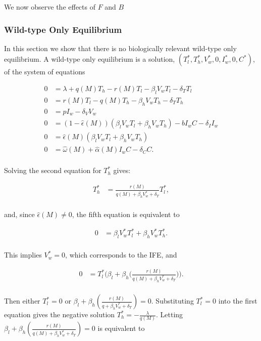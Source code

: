 \documentclass[11pt, oneside]{article}    %
\begin{document}
We now observe the effects of $F$ and $B$ 

\vspace{5mm}

\subsubsection{Wild-type Only Equilibrium}

In this section we show that there is no biologically relevant wild-type only equilibrium. A wild-type only equilibrium is a solution, $(T_l^*, T_h^*, V_w^*, 0, I_w^*, 0, C^*)$, of the system of equations 

\begin{align*}
 0 & =   \lambda + q(M) T_h - r(M) T_l  - {\beta_l} V_w T_l - \delta_T T_l \\
0 & = r(M) T_l - q(M) T_h  -  \beta_h V_w T_h - \delta_T T_h\\
0 & =  p I_w - \delta_V V_w\\
0 & =  (1-\hat{\epsilon}(M))(\beta_l V_w T_l + \beta_h V_w T_h) - b I_w C - \delta_I I_w\\
0 & =  \hat{\epsilon}(M)(\beta_l V_w T_l + \beta_h V_w T_h) \\
0 & =  \hat{\omega}(M) + \hat{\alpha}(M) I_w C - \delta_C C.\\
\end{align*}

Solving the second equation for $T_h^*$ gives:

\begin{align*}
 T_h^* & =  \frac{r(M)}{q(M)+\beta_h V_w^*  + \delta_T} T_l^*,\\
\end{align*}

and, since $\hat{\epsilon}(M) \neq 0$, the fifth equation is equivalent to

\begin{align*}
 0 & =  \beta_l V_w^* T_l^* + \beta_h V_w^* T_h^*.\\
\end{align*}

This implies $V_w^* = 0$, which corresponds to the IFE, and 

\begin{align*}
 0 & =   T_l^* \Big( \beta_l + \beta_h \Big( \frac{r(M)}{q(M)+\beta_h V_w^*  + \delta_T} \Big) \Big). \\
\end{align*}

Then either  $T_l^* = 0$ or $\beta_l + \beta_h ( \frac{r(M)}{q+\beta_h V_w^*  + \delta_T})  = 0$. Substituting $T_l^* = 0$ into the first equation gives the negative solution $T_h^* = -\frac{\lambda}{q(M)}$. Letting $\beta_l + \beta_h ( \frac{r(M)}{q(M)+\beta_h V_w^*  + \delta_T})  = 0$ is equivalent to 
\end{document}
